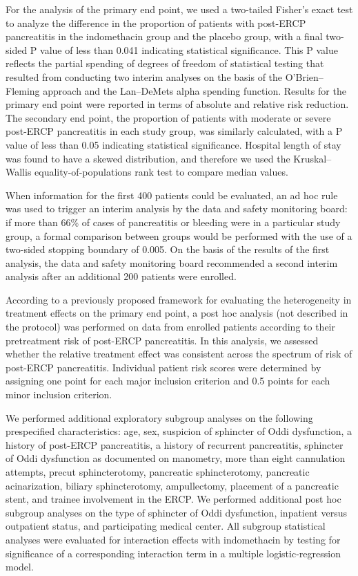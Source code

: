 \documentclass[
  10pt,
  letterpaper,
]{article}
\begin{document}
For the analysis of the primary end point, we used a two-tailed Fisher's
exact test to analyze the difference in the proportion of patients with
post-ERCP pancreatitis in the indomethacin group and the placebo group,
with a final two-sided P value of less than 0.041 indicating statistical
significance. This P value reflects the partial spending of degrees of
freedom of statistical testing that resulted from conducting two interim
analyses on the basis of the O'Brien--Fleming approach and the
Lan--DeMets alpha spending function. Results for the primary end point
were reported in terms of absolute and relative risk reduction. The
secondary end point, the proportion of patients with moderate or severe
post-ERCP pancreatitis in each study group, was similarly calculated,
with a P value of less than 0.05 indicating statistical significance.
Hospital length of stay was found to have a skewed distribution, and
therefore we used the Kruskal--Wallis equality-of-populations rank test
to compare median values.

When information for the first 400 patients could be evaluated, an ad
hoc rule was used to trigger an interim analysis by the data and safety
monitoring board: if more than 66\% of cases of pancreatitis or bleeding
were in a particular study group, a formal comparison between groups
would be performed with the use of a two-sided stopping boundary of
0.005. On the basis of the results of the first analysis, the data and
safety monitoring board recommended a second interim analysis after an
additional 200 patients were enrolled.

According to a previously proposed framework for evaluating the
heterogeneity in treatment effects on the primary end
point,\citep{kent2010} a post hoc analysis (not described in the
protocol) was performed on data from enrolled patients according to
their pretreatment risk of post-ERCP pancreatitis. In this analysis, we
assessed whether the relative treatment effect was consistent across the
spectrum of risk of post-ERCP pancreatitis. Individual patient risk
scores were determined by assigning one point for each major inclusion
criterion and 0.5 points for each minor inclusion criterion.

We performed additional exploratory subgroup analyses on the following
prespecified characteristics: age, sex, suspicion of sphincter of Oddi
dysfunction, a history of post-ERCP pancreatitis, a history of recurrent
pancreatitis, sphincter of Oddi dysfunction as documented on manometry,
more than eight cannulation attempts, precut sphincterotomy, pancreatic
sphincterotomy, pancreatic acinarization, biliary sphincterotomy,
ampullectomy, placement of a pancreatic stent, and trainee involvement
in the ERCP. We performed additional post hoc subgroup analyses on the
type of sphincter of Oddi dysfunction, inpatient versus outpatient
status, and participating medical center. All subgroup statistical
analyses were evaluated for interaction effects with indomethacin by
testing for significance of a corresponding interaction term in a
multiple logistic-regression model.\citep{kent2010}
\end{document}
